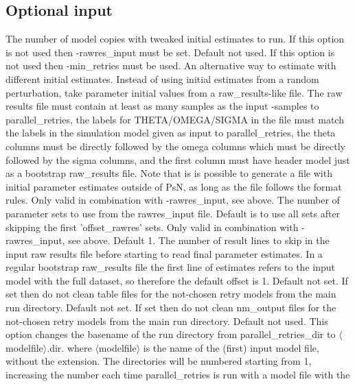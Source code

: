 \subsection{Optional input}
\begin{optionlist}
The number of model copies with tweaked initial estimates to run. 
If this option is not used then -rawres\_input must be set.
\nextopt
{}
Default not used. If this option is not used then -min\_retries must be used.
An alternative way to estimate with different initial estimates. 
Instead of using initial estimates from a random perturbation, take parameter initial values from a raw\_results-like file.
The raw results file must contain at least as many samples as the input -samples to parallel\_retries, the labels for  THETA/OMEGA/SIGMA 
in the file must match the labels in the simulation model given as input to parallel\_retries, 
the theta columns must be directly followed by the omega columns which must be directly followed by the sigma columns, and the first column 
must have header model just as a bootstrap raw\_results file. Note that is is possible to generate a file with initial parameter estimates outside of PsN, 
as long as the file follows the format rules.
\nextopt
{}
Only valid in combination with -rawres\_input, see above. The number of
parameter sets to use from the rawres\_input file. 
Default is to use all sets after skipping the first 'offset\_rawres' sets.
\nextopt
{}
Only valid in combination with -rawres\_input, see above. Default 1.
The number of result lines to skip in the input raw results file before starting to read final parameter estimates. In a regular
bootstrap raw\_results file the first line of estimates refers to the input model with the full dataset, so therefore the default offset is 1.
\nextopt
{}
Default not set. If set then do not clean table files for the not-chosen
retry models from the main run directory.
\nextopt
{}
Default not set. If set then do not clean nm\_output files for the not-chosen
retry models from the main run directory.
Default not used. This option changes the basename of the run directory from 
parallel\_retries\_dir to $\langle$modelfile$\rangle$.dir. where $\langle$modelfile$\rangle$ 
is the name of the (first) input model file, without the extension. 
The directories will be numbered starting from 1, increasing the number each time parallel\_retries 
is run with a model file with the 

\end{optionlist}

